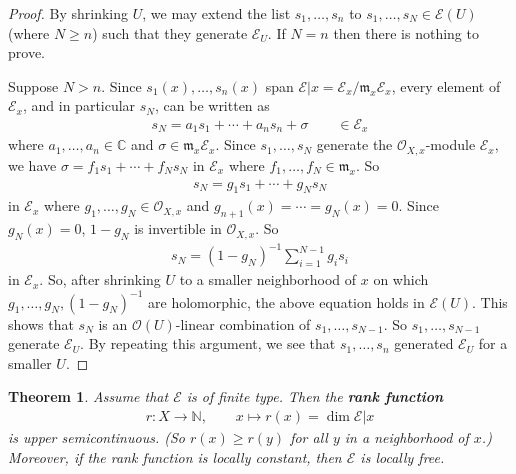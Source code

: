 \documentclass[11pt,b5paper,notitlepage]{article}
\theoremstyle{definition}
\theoremstyle{plain}
\newtheorem{thm}[df]{Theorem}
\newcommand{\fk}{\mathfrak}
\newcommand{\scr}{\mathscr}
\newcommand{\Cbb}{\mathbb C}
\newcommand{\Nbb}{\mathbb N}
\numberwithin{equation}{section}
\begin{document}
\begin{proof}
By shrinking $U$, we may extend the list $s_1,\dots,s_n$ to $s_1,\dots,s_N\in\scr E(U)$ (where $N\geq n$) such that they generate $\scr E_U$. If $N=n$ then there is nothing to prove. 

Suppose $N>n$. Since $s_1(x),\dots,s_n(x)$ span $\scr E|x=\scr E_x/\fk m_x\scr E_x$, every element of $\scr E_x$, and in particular $s_N$, can be written as 
\begin{align*}
s_N=a_1s_1+\cdots+a_ns_n+\sigma\qquad \in\scr E_x
\end{align*}
where $a_1,\dots,a_n\in\Cbb$ and $\sigma\in\fk m_x\scr E_x$. Since $s_1,\dots,s_N$ generate the $\scr O_{X,x}$-module $\scr E_x$, we have $\sigma=f_1s_1+\cdots+f_Ns_N$ in $\scr E_x$ where $f_1,\dots,f_N\in\fk m_x$. So
\begin{align*}
s_N=g_1s_1+\cdots+g_Ns_N
\end{align*} 
in $\scr E_x$ where $g_1,\dots,g_N\in\scr O_{X,x}$ and $g_{n+1}(x)=\cdots=g_N(x)=0$. Since $g_N(x)=0$, $1-g_N$ is invertible in $\scr O_{X,x}$. So
\begin{align*}
s_N=(1-g_N)^{-1}\sum_{i=1}^{N-1}g_is_i
\end{align*}
in $\scr E_x$. So, after shrinking $U$ to a smaller neighborhood of $x$  on which $g_1,\dots,g_N,(1-g_N)^{-1}$ are holomorphic, the above equation holds in  $\scr E(U)$. This shows that $s_N$ is an $\scr O(U)$-linear combination of $s_1,\dots,s_{N-1}$. So $s_1,\dots,s_{N-1}$ generate $\scr E_U$. By repeating this argument, we see that $s_1,\dots,s_n$ generated $\scr E_U$ for a smaller $U$.
\end{proof}


\begin{thm}\label{lba1}
Assume that $\scr E$ is of finite type. Then the \textbf{rank function}
\begin{align}
r:X\rightarrow\Nbb,\qquad x\mapsto r(x)=\dim\scr E|x
\end{align}
is upper semicontinuous. (So $r(x)\geq r(y)$ for all $y$ in a neighborhood of $x$.)  Moreover, if the rank function is locally constant, then $\scr E$ is locally free.
\end{thm}
\end{document}
